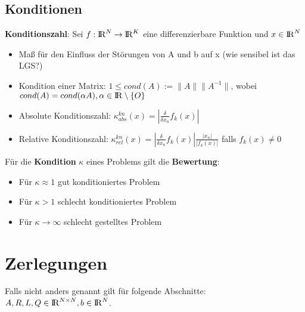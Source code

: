 \documentclass[10pt,a4paper]{article}
\def\realnumbers{{\rm I\!R}}
\newcommand{\norm}[1]{\lVert#1\rVert}
\begin{document}
	\subsection{Konditionen}
	\textbf{Konditionszahl}:
	Sei $f: \realnumbers^N \rightarrow \realnumbers^K$ eine differenzierbare Funktion und $x \in \realnumbers^N$
	\begin{itemize}
		\item Maß für den Einfluss der Störungen von A und b auf x (wie sensibel ist das LGS?)
		\item Kondition einer Matrix: $1 \leq cond(A) := \norm{A}\norm{A^{-1}}$, wobei $cond(A) = cond(\alpha A), \alpha\in\realnumbers\setminus\{O\}$
		\item Absolute Konditionszahl: $\kappa^{kn}_{abs}(x) = |\frac{\delta}{\delta x_n}f_k(x)|$
		\item Relative Konditionszahl: $\kappa^{kn}_{rel}(x) = |\frac{\delta}{\delta x_n}f_k(x)| \frac{|x_n|}{|f_k(x)|}$ falls $f_k(x) \neq 0$
	\end{itemize}
        Für die \textbf{Kondition} $\kappa$ eines Problems gilt die \textbf{Bewertung}:
        \begin{itemize}
                \item Für $\kappa \approx 1$ gut konditioniertes Problem
                \item Für $\kappa > 1$ schlecht konditioniertes Problem
                \item Für $\kappa \rightarrow \infty$ schlecht gestelltes Problem
        \end{itemize}
	\newpage
	\section{Zerlegungen}
	Falls nicht anders genannt gilt für folgende Abschnitte: $A, R, L, Q \in \realnumbers^{N \times N}, b \in \realnumbers^N$.
\end{document}
